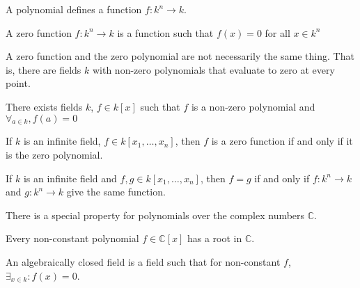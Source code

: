                 A polynomial defines a function $f:k^{n}\rightarrow{k}$.
                \begin{definition}
                    A zero function $f:k^{n}\rightarrow{k}$
                    is a function such that $f(x)=0$
                    for all $x\in{k^{n}}$
                \end{definition}
                A zero function and the zero polynomial are not necessarily
                the same thing. That is, there are fields $k$ with non-zero
                polynomials that evaluate to zero at every point.
                \begin{theorem}
                    There exists fields $k$, $f\in k[x]$ such
                    that $f$ is a non-zero polynomial and
                    $\forall_{a\in k},f(a)=0$
                \end{theorem}
                \begin{theorem}
                    If $k$ is an infinite field,
                    $f\in k[x_1,\hdots ,x_n]$, then $f$ is a
                    zero function if and only if it is
                    the zero polynomial.
                \end{theorem}
                \begin{theorem}
                    If $k$ is an infinite field and
                    $f,g\in k[x_1,\hdots,x_n]$, then $f=g$ if and
                    only if $f:k^n\rightarrow k$ and
                    $g:k^n \rightarrow k$ give
                    the same function.
                \end{theorem}
                There is a special property for polynomials
                over the complex numbers $\mathbb{C}$.
                \begin{theorem}
                    Every non-constant polynomial
                    $f\in\mathbb{C}[x]$ has a root in $\mathbb{C}$.
                \end{theorem}
                \begin{definition}
                    An algebraically closed field is a field
                    such that for non-constant $f$,
                    $\exists_{x\in k}:f(x)=0$.
                \end{definition}
